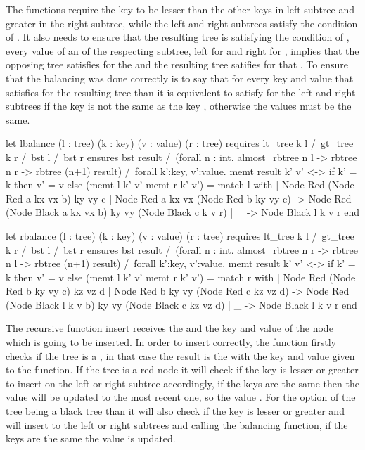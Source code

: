 The functions require the key  to be lesser than the other keys in left subtree and greater in the
right subtree, while the left and right subtrees satisfy the condition of . It also needs to ensure that the resulting tree is
satisfying the condition of , every value  of an  of the respecting subtree, left for 
and right for , implies that the opposing tree satisfies  for the  and the resulting tree satifies
 for that . To ensure that the balancing was done correctly is to say that for every key  and value 
that satisfies  for the resulting tree than it is equivalent to satisfy  for the left and right subtrees if the key 
is not the same as the key , otherwise the values must be the same.

\begin{whylang}
    let lbalance (l : tree) (k : key) (v : value) (r : tree)
        requires { lt_tree k l /\ gt_tree k r /\ bst l /\ bst r }
        ensures { bst result /\
        (forall n : int. almost_rbtree n l -> rbtree n r -> rbtree (n+1) result)
        /\
        forall k':key, v':value.
            memt result k' v' <->
            if k' = k then v' = v else (memt l k' v' \/ memt r k' v') }
    = match l with
        | Node Red (Node Red a kx vx b) ky vy c
        | Node Red a kx vx (Node Red b ky vy c) ->
            Node Red (Node Black a kx vx b) ky vy (Node Black c k v r)
        | _ ->
            Node Black l k v r
        end

    let rbalance (l : tree) (k : key) (v : value) (r : tree)
        requires { lt_tree k l /\ gt_tree k r /\ bst l /\ bst r }
        ensures { bst result /\
        (forall n : int. almost_rbtree n r -> rbtree n l -> rbtree (n+1) result)
        /\
        forall k':key, v':value.
            memt result k' v' <->
            if k' = k then v' = v else (memt l k' v' \/ memt r k' v') }
    = match r with
        | Node Red (Node Red b ky vy c) kz vz d
        | Node Red b ky vy (Node Red c kz vz d) ->
            Node Red (Node Black l k v b) ky vy (Node Black c kz vz d)
        | _ ->
            Node Black l k v r
        end
\end{whylang}

The recursive function insert receives the  and the key  and value  of the node which is going to
be inserted. In order to insert correctly, the function firstly checks if the tree is a , in that case the result is the 
with the key and value given to the function. If the tree is a red node it will check if the key  is lesser or greater to insert on the
left or right subtree accordingly, if the keys are the same then the value will be updated to the most recent one, so the value . For the
option of the tree being a black tree than it will also check if the key \inlinecode{k} is lesser or greater and will insert to the left or right
subtrees and calling the balancing function, if the keys are the same the value is updated.

